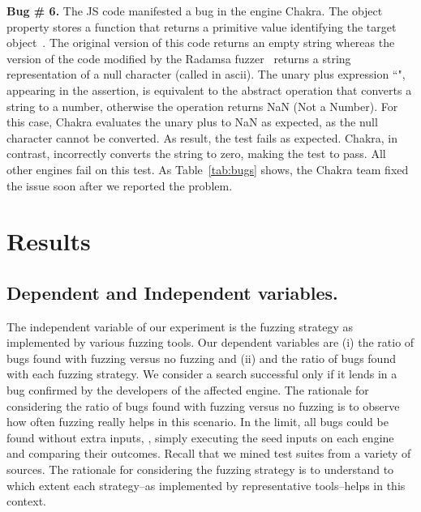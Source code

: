 \documentclass[10pt,conference,anonymous]{IEEEtran}
\begin{document}
 

\vspace{1ex}\noindent\textbf{Bug \# 6.} The JS code  
manifested a bug in the \js{} engine Chakra.  The object
property  stores a function that returns a primitive
value identifying the target object~\cite{valueof}. The original
version of this code returns an empty string whereas the version of
the code modified by the Radamsa fuzzer~\cite{radamsa} returns a string
representation of a null character (called  in ascii). The
unary plus expression ``", appearing in the assertion, is
equivalent to the abstract operation 
that converts a string to a number, otherwise the operation returns
NaN (Not a Number)\cite{unary-plus}. For this case, Chakra evaluates
the unary plus to NaN as expected, as the null character cannot be
converted. As result, the test fails as expected. Chakra, in contrast,
incorrectly converts the string to zero, making the test to pass. All
other engines fail on this test. As Table~\ref{tab:bugs} shows, the
Chakra team fixed the issue soon after we reported the problem.

\section{Results}
\label{sec:results}


\subsection{Dependent and Independent variables.}

The independent variable of our experiment is the fuzzing strategy as
implemented by various fuzzing tools. Our dependent variables are (i)
the ratio of bugs found with fuzzing versus no fuzzing and (ii) and
the ratio of bugs found with each fuzzing strategy. We consider a
search successful only if it lends in a bug confirmed by the
developers of the affected engine.  The rationale for considering the
ratio of bugs found with fuzzing versus no fuzzing is to observe how
often fuzzing really helps in this scenario. In the limit, all bugs
could be found without extra inputs, \ie{}, simply executing the seed
inputs on each engine and comparing their outcomes. Recall that we
mined test suites from a variety of sources. The rationale for
considering the fuzzing strategy is to understand to which extent each
strategy--as implemented by representative tools--helps in this
context.
\end{document}

